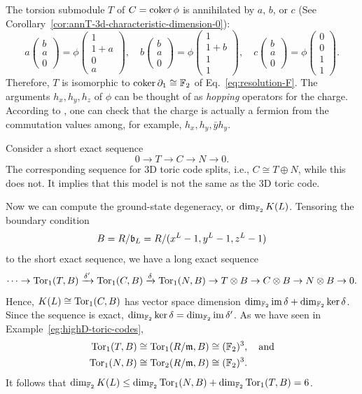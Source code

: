 \begin{example}
The torsion submodule $T$ of $C = \mathop{\mathrm{coker}}\nolimits \phi$ is annihilated by $a$, $b$, or $c$
(See Corollary~\ref{cor:annT-3d-characteristic-dimension-0}):
\[
 a \begin{pmatrix} b \\ a \\ 0 \end{pmatrix} =\phi \begin{pmatrix} 1 \\ 1+a \\ 0 \\ a \end{pmatrix}, \quad
 b \begin{pmatrix} b \\ a \\ 0 \end{pmatrix} =\phi \begin{pmatrix} 1 \\ 1+b \\ 1 \\ 1 \end{pmatrix}, \quad
 c \begin{pmatrix} b \\ a \\ 0 \end{pmatrix} =\phi \begin{pmatrix} 0 \\ 0 \\ 1 \\ 1 \end{pmatrix}.
\]
Therefore, $T$ is isomorphic to $\mathop{\mathrm{coker}}\nolimits \partial_1 \cong \mathbb{F}_2$ of Eq.~\eqref{eq:resolution-F}.
The arguments $h_x,h_y,h_z$ of $\phi$ can be thought of as \emph{hopping} operators for the charge.
According to \cite{LevinWen2003Fermions}, one can check that the charge is actually a fermion
from the commutation values among, for example, $h_x,h_y,\bar y h_y$.


Consider a short exact sequence
\[
 0 \to T \to C \to N \to 0 .
\]
The corresponding sequence for 3D toric code splits,
i.e., $C \cong T \oplus N$, while this does not.
It implies that this model is not the same as the 3D toric code.

Now we can compute the ground-state degeneracy, or $\dim_{\mathbb{F}_2} K(L)$.
Tensoring the boundary condition
\[
B = R/\mathfrak{b}_L = R/(x^L-1,y^L-1,z^L-1)
\]
to the short exact sequence,
we have a long exact sequence
\[
 \cdots \to
\mathop{\mathrm{Tor}}\nolimits_1(T,B) \xrightarrow{\delta'} \mathop{\mathrm{Tor}}\nolimits_1( C, B) \xrightarrow{\delta} \mathop{\mathrm{Tor}}\nolimits_1(N,B) 
\to T \otimes B \to C \otimes B \to N \otimes B \to 0 .
\]
Hence, $K(L) \cong \mathop{\mathrm{Tor}}\nolimits_1( C,B)$ has vector space dimension $\dim_{\mathbb{F}_2} \mathop{\mathrm{im}}\nolimits \delta + \dim_{\mathbb{F}_2} \ker \delta$.
Since the sequence is exact, $\dim_{\mathbb{F}_2} \ker \delta = \dim_{\mathbb{F}_2} \mathop{\mathrm{im}}\nolimits \delta'$.
As we have seen in Example~\ref{eg:highD-toric-codes},
\begin{align*}
 \mathop{\mathrm{Tor}}\nolimits_1(T,B) & \cong \mathop{\mathrm{Tor}}\nolimits_1(R/\mathfrak{m},B) \cong (\mathbb{F}_2)^3 , \quad \text{and} \\
 \mathop{\mathrm{Tor}}\nolimits_1(N,B) & \cong \mathop{\mathrm{Tor}}\nolimits_2(R/\mathfrak{m},B) \cong (\mathbb{F}_2)^3 .
\end{align*}
It follows that $\dim_{\mathbb{F}_2} K(L) \le \dim_{\mathbb{F}_2} \mathop{\mathrm{Tor}}\nolimits_1(N,B) + \dim_{\mathbb{F}_2} \mathop{\mathrm{Tor}}\nolimits_1(T,B) = 6$.


\end{example}
